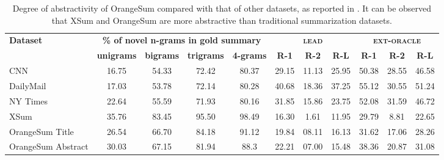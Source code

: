 \documentclass[11pt,a4paper]{article}
\begin{document}
\begin{table*}[ht]
\small
  \begin{center}{
  \begin{tabular}{| l | c c c c | c c c | c c c |}
    \hline
    \multirow{2}{*}{\textbf{Dataset}} & \multicolumn{4}{c|}{\textbf{\% of novel n-grams in gold summary}} & \multicolumn{3}{c|}{\textsc{\textbf{lead}}} & \multicolumn{3}{c|}{\textsc{\textbf{ext-oracle}}} \\
    & \textbf{unigrams} & \textbf{bigrams} & \textbf{trigrams} & \textbf{4-grams} & \textbf{R-1} &\textbf{ R-2} & \textbf{R-L} & \textbf{R-1} & \textbf{R-2} & \textbf{R-L} \\ \hline 
    CNN & 16.75 & 54.33 & 72.42 & 80.37 & 29.15 & 11.13 & 25.95 & 50.38 & 28.55 & 46.58 \\
    DailyMail & 17.03 & 53.78 & 72.14 & 80.28 & 40.68 & 18.36 & 37.25 & 55.12 & 30.55 & 51.24 \\
    NY Times & 22.64 & 55.59 & 71.93 & 80.16 & 31.85 & 15.86 & 23.75 & 52.08 & 31.59 & 46.72 \\
    \hline
    XSum & 35.76 & 83.45 & 95.50 & 98.49  & 16.30 & 1.61  & 11.95  & 29.79  & 8.81  & 22.65  \\
    OrangeSum Title & 26.54 & 66.70 & 84.18 & 91.12 & 19.84 & 08.11  & 16.13  & 31.62  & 17.06  & 28.26  \\
    OrangeSum Abstract & 30.03 & 67.15 & 81.94 & 88.3 & 22.21 & 07.00 & 15.48 & 38.36 & 20.87 & 31.08 \\
	\hline
  \end{tabular}}
  \end{center}
\caption{Degree of abstractivity of OrangeSum compared with that of other datasets, as reported in \citet{narayan2018don}.
It can be observed that XSum and OrangeSum are more abstractive than traditional summarization datasets. \label{table:orangesum_2}}
\end{table*}
\end{document}
